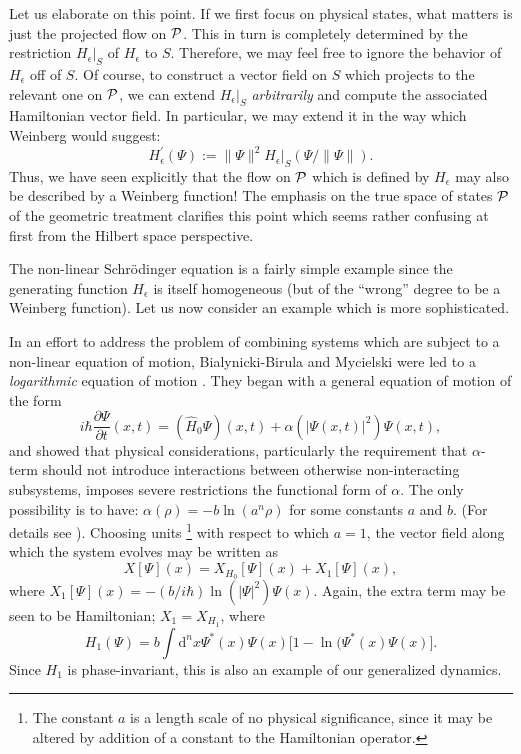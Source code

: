 \documentclass[12pt,aps,eqsecnum,tighten]{revtex4-2}
\def\be{\begin{equation}}
\def\ee{\end{equation}}
\def\d{{\mathrm d}}
\def\i{{i}}
\def\P{{\cal P}}
\newcommand{\hvf}[1]{{X_{#1}}}
\begin{document}
Let us elaborate on this point. If we first focus on physical states,
what matters is just the projected flow on $\P$. This in turn is
completely determined by the restriction $H_\epsilon \big|_S$ of
$H_\epsilon$ to $S$. Therefore, we may feel free to ignore the
behavior of $H_\epsilon$ off of $S$.  Of course, to construct a vector
field on $S$ which projects to the relevant one on $\P$, we can extend
$H_\epsilon \big|_S$ {\em arbitrarily} and compute the associated
Hamiltonian vector field.  In particular, we may extend it in the way
which Weinberg would suggest:
%
\be H_\epsilon^\prime(\Psi) := \| \Psi \|^2 H_\epsilon 
\big|_S(\Psi / \|\Psi\|).  
\ee 
%
Thus, we have seen explicitly that the flow on $\P$ which is defined
by $H_\epsilon$ may also be described by a Weinberg function! The
emphasis on the true space of states $\P$ of the geometric treatment
clarifies this point which seems rather confusing at first from the 
Hilbert space perspective.

The non-linear Schr\"odinger equation is a fairly simple example since
the generating function $H_\epsilon$ is itself homogeneous (but of the
``wrong'' degree to be a Weinberg function).  Let us now consider an
example which is more sophisticated.

In an effort to address the problem of combining systems which are
subject to a non-linear equation of motion, Bialynicki-Birula and
Mycielski were led to a {\em logarithmic} equation of motion
\cite{birula}. They began with a general equation of motion of the
form
%
\be \label{gen_nonlin}
\i\hbar \frac{\partial \Psi}{\partial t}(x,t) =
(\hat{H}_0\Psi)(x,t) + \alpha( | \Psi(x,t) |^2 ) \Psi(x,t),
\ee
%
and showed that physical considerations, particularly the requirement
that $\alpha$-term should not introduce interactions between otherwise
non-interacting subsystems, imposes severe restrictions the functional
form of $\alpha$. The only possibility is to have: $\alpha(\rho) = -b
\ln(a^n\rho)$ for some constants $a$ and $b$. (For details see
\cite{birula}).  Choosing units%
%
\footnote{The constant $a$ is a length scale of no physical
significance, since it may be altered by addition of a constant to the
Hamiltonian operator.}
%
with respect to which $a=1$, the vector field along which the system
evolves may be written as 
%
\be X[\Psi](x) = \hvf{H_0}[\Psi](x) +X_1[\Psi](x), \ee 
%
where $X_1[\Psi](x) = -(b/\i\hbar) \ln(|\Psi|^2) \Psi(x)$.  Again, the
extra term may be seen to be Hamiltonian; $X_1 = \hvf{H_1}$, where 
%
\be
H_1(\Psi) = b \int \d^n \! x \Psi^*(x) \Psi(x) \big[ 1 - 
\ln(\Psi^*(x) \Psi(x) \big].  
\ee
%
Since $H_1$ is phase-invariant, this is also an example of our
generalized dynamics.
\end{document}
